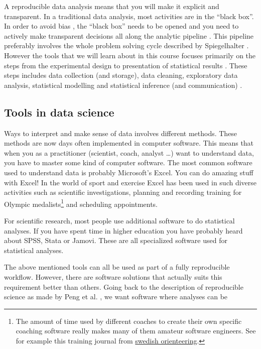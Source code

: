 \documentclass[
]{article}
\begin{document}
A reproducible data analysis means that you will make it explicit and transparent. In a traditional data analysis, most activities are in the ``black box''. In order to avoid bias \citep{RN1953}, the ``black box'' needs to be opened and you need to actively make transparent decisions all along the analytic pipeline \citep{RN1955}. This pipeline preferably involves the whole problem solving cycle described by Spiegelhalter \citep{RN2902}. However the tools that we will learn about in this course focuses primarily on the steps from the experimental design to presentation of statistical results \citep{RN1955}. These steps includes data collection (and storage), data cleaning, exploratory data analysis, statistical modelling and statistical inference (and communication) \citep{RN1955}.

\hypertarget{tools-in-data-science}{%
\subsection{Tools in data science}\label{tools-in-data-science}}

Ways to interpret and make sense of data involves different methods. These methods are now days often implemented in computer software. This means that when you as a practitioner (scientist, coach, analyst \ldots) want to understand data, you have to master some kind of computer software. The most common software used to understand data is probably Microsoft's Excel. You can do amazing stuff with Excel! In the world of sport and exercise Excel has been used in such diverse activities such as scientific investigations, planning and recording training for Olympic medalists\footnote{The amount of time used by different coaches to create their own specific coaching software really makes many of them amateur software engineers. See for example this training journal from \href{http://obasen.orientering.se/traningsdagbok/installationshandledning.htm}{swedish orienteering}.} and scheduling appointments.

For scientific research, most people use additional software to do statistical analyses. If you have spent time in higher education you have probably heard about SPSS, Stata or Jamovi. These are all specialized software used for statistical analyses.

The above mentioned tools can all be used as part of a fully reproducible workflow. However, there are software solutions that actually suits this requirement better than others. Going back to the description of reproducible science as made by Peng et al. \citep{RN1492}, we want software where analyses can be
\end{document}
